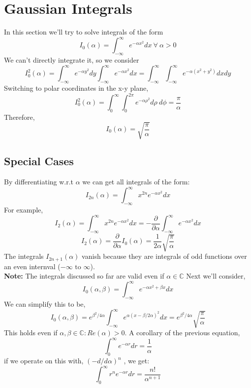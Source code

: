 \section{Gaussian Integrals}
In this section we'll try to solve integrals of the form
\begin{equation}
I_{0} (\alpha) = \int_{-\infty}^{\infty} e^{-\alpha x^{2}} dx \ \forall \ \alpha > 0
\end{equation}
We can't directly integrate it, so we consider
\begin{equation}
I^{2}_{0}(\alpha) = \int_{-\infty}^{\infty} e^{-\alpha y^{2}} dy\int_{-\infty}^{\infty} e^{-\alpha x^{2}} dx = \int_{-\infty}^{\infty}\int_{-\infty}^{\infty}e^{-\alpha (x^{2} + y^{2})} dxdy
\end{equation}
Switching to polar coordinates in the x-y plane,
\begin{equation}
I^{2}_{0}(\alpha) = \int_{0}^{\infty} \int_{0}^{2 \pi} e^{-\alpha \rho^{2}} d \rho \ d\phi = \frac{\pi}{\alpha}
\end{equation}
Therefore,
\begin{equation}
	I_{0}(\alpha) = \sqrt{\frac{\pi}{\alpha}}
\end{equation}
\subsection{Special Cases}
By differentiating w.r.t $\alpha$ we can get all integrals of the form:
\begin{equation}
I_{2n} (\alpha) = \int_{-\infty}^{\infty} x^{2n} e^{-\alpha x^{2}} dx
\end{equation}
For example,
$$I_{2}(\alpha) = \int_{-\infty}^{\infty} x^{2n} e^{-\alpha x^{2}} dx = -\frac{\partial }{\partial \alpha} \int_{-\infty}^{\infty} e^{-\alpha x^{2}} dx$$
$$I_{2}(\alpha) = \frac{\partial }{\partial \alpha} I_{0}(\alpha) = \frac{1}{2 \alpha} \sqrt{\frac{\pi}{\alpha}}$$
The integrals $I_{2n+1}(\alpha)$ vanish because they are integrals of odd functions over an even internval ($-\infty \text{ to } \infty$).
\\ \textbf{Note:} The integrals discussed so far are valid even if $\alpha \in \mathbb{C}$
Next we'll consider,
\begin{equation}
I_{0}(\alpha, \beta) = \int_{- \infty}^{\infty} e^{-\alpha x^{2} + \beta x} dx
\end{equation}
We can simplify this to be,
$$I_{0}(\alpha, \beta) = e^{\beta^{2}/ 4 \alpha} \int_{- \infty}^{\infty} e^{\alpha{(x - \beta / 2 \alpha)}^{2}} dx = e^{\beta^{2}/ 4 \alpha} \sqrt{\frac{\pi}{\alpha}}$$
This holds even if $\alpha, \beta \in \mathbb{C} : Re(\alpha) > 0$. A corollary of the previous equation,
$$\int_{0}^{\infty} e^{-\alpha r} dr = \frac{1}{\alpha}$$
if we operate on this with, ${(-d/d \alpha)}^{n}$ , we get:
$$\int_{0}^{\infty} r^{n} e^{-\alpha r} dr = \frac{n!}{\alpha^{n+1}}$$
